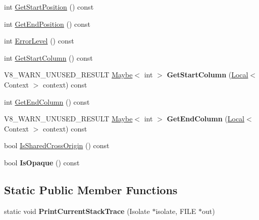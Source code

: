 \begin{DoxyCompactItemize}
\item 
int \mbox{\hyperlink{classv8_1_1Message_a8c32ad25c164ecec1bae0293449589f4}{Get\+Start\+Position}} () const
\item 
int \mbox{\hyperlink{classv8_1_1Message_a9a6c55ffea2eb6841d67afec40300641}{Get\+End\+Position}} () const
\item 
int \mbox{\hyperlink{classv8_1_1Message_a91bb679f695d82c2c2228645ca4497c6}{Error\+Level}} () const
\item 
int \mbox{\hyperlink{classv8_1_1Message_a3be9714cc977899bc1c935b00a140969}{Get\+Start\+Column}} () const
\item 
\mbox{\label{classv8_1_1Message_a6051fbca9ed6bee7bb5726363de20a5a}} 
V8\+\_\+\+W\+A\+R\+N\+\_\+\+U\+N\+U\+S\+E\+D\+\_\+\+R\+E\+S\+U\+LT \mbox{\hyperlink{classv8_1_1Maybe}{Maybe}}$<$ int $>$ {\bfseries Get\+Start\+Column} (\mbox{\hyperlink{classv8_1_1Local}{Local}}$<$ Context $>$ context) const
\item 
int \mbox{\hyperlink{classv8_1_1Message_ae188ca2457adbb3628681782bc757dc8}{Get\+End\+Column}} () const
\item 
\mbox{\label{classv8_1_1Message_a258b25b3a4f87922b0bbe4e388be6a1f}} 
V8\+\_\+\+W\+A\+R\+N\+\_\+\+U\+N\+U\+S\+E\+D\+\_\+\+R\+E\+S\+U\+LT \mbox{\hyperlink{classv8_1_1Maybe}{Maybe}}$<$ int $>$ {\bfseries Get\+End\+Column} (\mbox{\hyperlink{classv8_1_1Local}{Local}}$<$ Context $>$ context) const
\item 
bool \mbox{\hyperlink{classv8_1_1Message_a60e48ec814c324c443043dfaf366590a}{Is\+Shared\+Cross\+Origin}} () const
\item 
\mbox{\label{classv8_1_1Message_adc719181a3b29658bb250c6f27bf60d8}} 
bool {\bfseries Is\+Opaque} () const
\end{DoxyCompactItemize}
\subsection*{Static Public Member Functions}
\begin{DoxyCompactItemize}
\item 
\mbox{\label{classv8_1_1Message_ae5d67d123c5611e6bc36824c938cbfa5}} 
static void {\bfseries Print\+Current\+Stack\+Trace} (Isolate $\ast$isolate, F\+I\+LE $\ast$out)
\end{DoxyCompactItemize}
